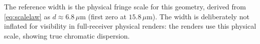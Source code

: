 The reference width is the physical fringe scale for this geometry, derived
from \eqref{eq:scalelaw} as $d \approx 6.8\,\mu\text{m}$ (first zero at $15.8\,\mu\text{m}$).
The width is deliberately not inflated for visibility in full-receiver physical renders:
the renders use this physical scale, showing true chromatic dispersion.
